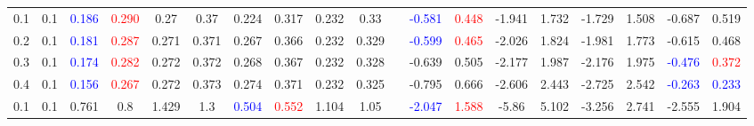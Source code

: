 \documentclass[specialist,
substylefile = spbu_report.rtx,
subf,12pt]{disser}
\theoremstyle{definition}
\begin{document}
\begin{table}
{\begin{tabular}{m{1cm}m{1cm}ccccccccm{0.2cm}cccccccc}
			0.1 & 0.1    & \textcolor{blue}{0.186}                      & \textcolor{red}{0.290}                     & 0.27                                          & 0.37                        & 0.224                   & 0.317                                   & 0.232                                      & 0.33                     &                             & \textcolor{blue}{-0.581} & \textcolor{red}{0.448} & -1.941                   & 1.732                  & -1.729   & 1.508                   & -0.687                   & 0.519                   \\
			0.2 & 0.1    & \textcolor{blue}{0.181}                      & \textcolor{red}{0.287}                     & 0.271                                         & 0.371                       & 0.267                   & 0.366                                   & 0.232                                      & 0.329                    &                             & \textcolor{blue}{-0.599} & \textcolor{red}{0.465} & -2.026                   & 1.824                  & -1.981   & 1.773                   & -0.615                   & 0.468                   \\
			0.3 & 0.1    & \textcolor{blue}{0.174}                      & \textcolor{red}{0.282}                     & 0.272                                         & 0.372                       & 0.268                   & 0.367                                   & 0.232                                      & 0.328                    &                             & -0.639                   & 0.505                  & -2.177                   & 1.987                  & -2.176   & 1.975                   & \textcolor{blue}{-0.476} & \textcolor{red}{0.372}  \\
			0.4 & 0.1    & \textcolor{blue}{0.156}                      & \textcolor{red}{0.267}                     & 0.272                                         & 0.373                       & 0.274                   & 0.371                                   & 0.232                                      & 0.325                    &                             & -0.795                   & 0.666                  & -2.606                   & 2.443                  & -2.725   & 2.542                   & \textcolor{blue}{-0.263} & \textcolor{blue}{0.233} \\
			\hline
			0.1 & 0.1    & 0.761                                        & 0.8                                        & 1.429                                         & 1.3                         & \textcolor{blue}{0.504} & \textcolor{red}{0.552}                  & 1.104                                      & 1.05                     &                             & \textcolor{blue}{-2.047} & \textcolor{red}{1.588} & -5.86                    & 5.102                  & -3.256   & 2.741                   & -2.555                   & 1.904                   \\

\end{tabular}}
\end{table}
\end{document}
